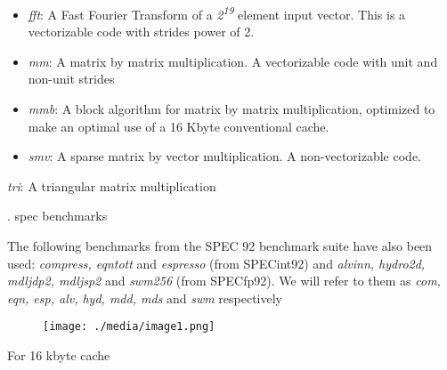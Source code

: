 \documentclass[12pt]{article}
\begin{document}
\setlength{\parskip}{3.72pt}
\begin{itemize}
	\item \textit{fft}: A Fast Fourier Transform of a \textit{2\textsuperscript{19}} element input vector. This is a vectorizable code with strides power of 2.\par

\setlength{\parskip}{3.84pt}
	\item \textit{mm}: A matrix by matrix multiplication. A vectorizable code with unit and non-unit strides\par

	\item \textit{mmb}: A block algorithm for matrix by matrix multiplication, optimized to make an optimal use of a 16 Kbyte conventional cache.\par

	\item \textit{smv}: A sparse matrix by vector multiplication. A non-vectorizable code.
\end{itemize}\par

\setlength{\parskip}{8.04pt}
\textit{tri}: A triangular matrix multiplication\par

{\fontsize{14pt}{16.8pt}. spec benchmarks \par}The following benchmarks from the SPEC 92 benchmark suite have also been used: \textit{compress, eqntott }and \textit{espresso }(from SPECint92) and \textit{alvinn, hydro2d, mdljdp2, mdljsp2 }and \textit{swm256 }(from SPECfp92). We will refer to them as \textit{com, eqn, esp, alv, hyd, mdd, mds }and \textit{swm }respectively\par




\begin{figure}[H]
	\begin{Center}
		\texttt{[image: ./media/image1.png]}
	\end{Center}
\end{figure}



\par

{\fontsize{10pt}{12.0pt}\selectfont For 16 kbyte cache\par}\par
\end{document}
